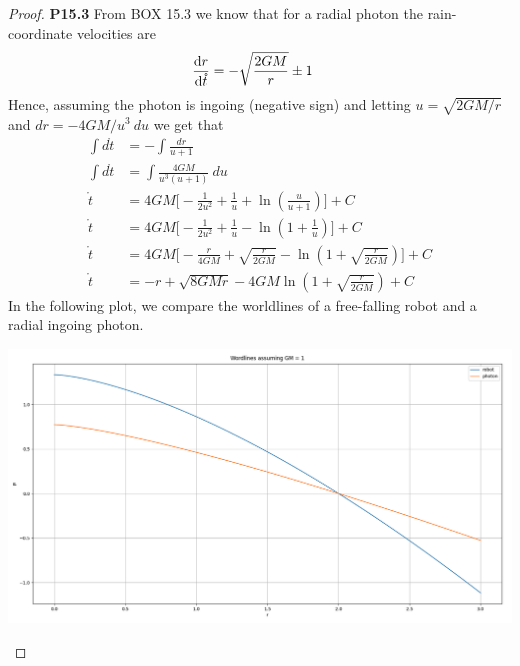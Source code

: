 \documentclass[11pt]{article}
\theoremstyle{definition}
\begin{document}
\cleardoublepage
\begin{proof}{\textbf{P15.3}}
From BOX 15.3 we know that for a radial photon the rain-coordinate velocities
are
\begin{align*}
    \dv{r}{\mathring{t}} &= -\sqrt{\frac{2GM}{r}} \pm 1
\end{align*}
Hence, assuming the photon is ingoing (negative sign) and letting
$u = \sqrt{2GM/r}$ and $dr = -4GM/u^3~du$ we get that
\begin{align*}
    \int d\mathring{t} &= -\int \frac{dr}{u + 1}\\
    \int d\mathring{t} &= \int \frac{4GM}{u^3(u + 1)}~du\\
    \mathring{t}
    &= 4GM\bigg[-\frac{1}{2u^2} + \frac{1}{u} + \ln(\frac{u}{u + 1})\bigg] + C\\
    \mathring{t}
    &= 4GM\bigg[-\frac{1}{2u^2} + \frac{1}{u} - \ln(1 + \frac{1}{u})\bigg] + C\\
    \mathring{t}
    &= 4GM\bigg[
        -\frac{r}{4GM} + \sqrt{\frac{r}{2GM}} - \ln(1 + \sqrt{\frac{r}{2GM}})
    \bigg] + C\\
    \mathring{t} &= -r + \sqrt{8GMr} - 4GM\ln(1 + \sqrt{\frac{r}{2GM}}) + C
\end{align*}
In the following plot, we compare the worldlines of a free-falling robot and a
radial ingoing photon.
\begin{center}
    \includegraphics[scale=0.25]{ch15-p15.3.png}
\end{center}
\end{proof}
\end{document}
